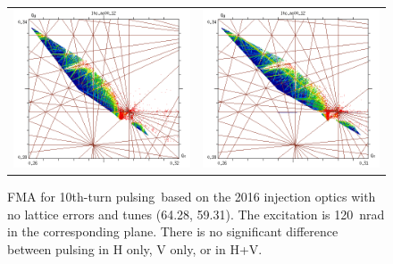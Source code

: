 \documentclass[
prstab
,reprint
,linenumbers
,longbibliography
,preprintnumbers
,showkeys
,amsfonts,amssymb,amsmath
,floatfix
]{revtex4-1}
\newcommand{\tenthtp}{10th-turn pulsing}
\newlength{\fmawidth}
\newlength{\smallfmawidth}
\begin{document}
\begin{figure}
\begin{tabular}{cc}
    \includegraphics[width=\smallfmawidth]{2016injnocolc15o+19_6noerrut10skh_dp0_ord10.png} &
    \includegraphics[width=\smallfmawidth]{2016injnocolc15o+19_6noerrut10skv_dp0_ord10.png} \\
  \end{tabular}
  \caption{FMA for \tenthtp\ based on the 2016 injection
    optics with no lattice errors and tunes (64.28, 59.31). The
    excitation is 120~nrad in the corresponding plane. There is no
    significant difference between pulsing in H only, V only, or in H+V.}
  \label{fig:fma:10}
\end{figure}
\end{document}
